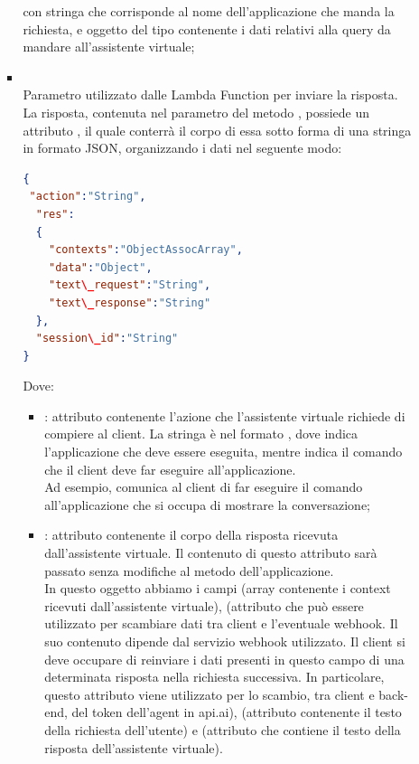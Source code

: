 \begin{itemize}
\begin{itemize}
\begin{itemize}
con  stringa che corrisponde al nome dell'applicazione che manda la richiesta, e  oggetto del tipo  contenente i dati relativi alla query da mandare all'assistente virtuale;
			\item {} \\
			Parametro utilizzato dalle Lambda Function per inviare la risposta. La risposta, contenuta nel  parametro del metodo , possiede un attributo , il quale conterrà il corpo di essa sotto forma di una stringa in formato JSON, organizzando i dati nel seguente modo:
 \begin{lstlisting}[language=json,firstnumber=1]
{
 "action":"String",
  "res":
  {
    "contexts":"ObjectAssocArray",
    "data":"Object",
    "text\_request":"String",
    "text\_response":"String"
  },
  "session\_id":"String"
}
\end{lstlisting}
Dove:
\begin{itemize}
   \item {}: attributo contenente l'azione che l'assistente virtuale richiede di compiere al client. La stringa è nel formato , dove  indica l'applicazione che deve essere   eseguita, mentre  indica il comando che il client deve far eseguire all'applicazione. \\ Ad esempio,  comunica al client di far eseguire il comando  all'applicazione che si occupa di mostrare la conversazione;
   \item {}: attributo contenente il corpo della risposta ricevuta dall'assistente virtuale. Il contenuto di questo attributo sarà passato senza modifiche al metodo  dell'applicazione.\\ In questo oggetto abbiamo i campi  (array contenente i context ricevuti dall'assistente virtuale),  (attributo che può essere utilizzato per scambiare dati tra client e l'eventuale webhook. Il suo contenuto dipende dal servizio webhook utilizzato. Il client si deve occupare di reinviare i dati presenti in questo campo  di una determinata risposta nella richiesta successiva. In particolare, questo attributo viene utilizzato per lo scambio, tra client e back-end, del token dell'agent in api.ai),  (attributo contenente il testo della richiesta dell'utente) e (attributo che contiene il testo della risposta dell'assistente virtuale).

\end{itemize}
\end{itemize}
\end{itemize}
\end{itemize}
